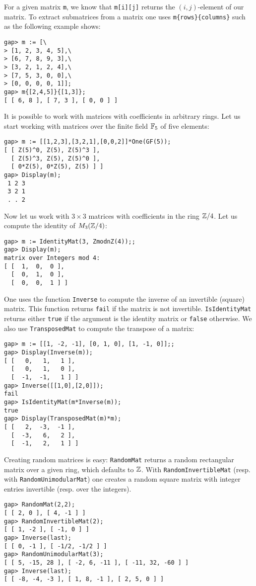 For a given matrix \lstinline{m}, we know that 
\lstinline{m[i][j]} returns the $(i,j)$-element of our matrix. 
To extract submatrices from a matrix one uses 
\lstinline|m{rows}{columns}| such as the following example shows:
\begin{lstlisting}
gap> m := [\
> [1, 2, 3, 4, 5],\
> [6, 7, 8, 9, 3],\
> [3, 2, 1, 2, 4],\
> [7, 5, 3, 0, 0],\
> [0, 0, 0, 0, 1]];
gap> m{[2,4,5]}{[1,3]};
[ [ 6, 8 ], [ 7, 3 ], [ 0, 0 ] ]
\end{lstlisting}

It is possible to work with matrices with coefficients in arbitrary rings. Let
us start working with matrices over the finite field $\mathbb{F}_5$ of five elements:
\begin{lstlisting}
gap> m := [[1,2,3],[3,2,1],[0,0,2]]*One(GF(5));
[ [ Z(5)^0, Z(5), Z(5)^3 ], 
  [ Z(5)^3, Z(5), Z(5)^0 ], 
  [ 0*Z(5), 0*Z(5), Z(5) ] ]
gap> Display(m);
 1 2 3
 3 2 1
 . . 2
\end{lstlisting}
Now let us work with $3\times 3$ matrices with coefficients 
in the ring $\mathbb{Z}/4$. Let us compute the identity of $M_3(\mathbb{Z}/4)$:
\begin{lstlisting}
gap> m := IdentityMat(3, ZmodnZ(4));;
gap> Display(m);
matrix over Integers mod 4:
[ [  1,  0,  0 ],
  [  0,  1,  0 ],
  [  0,  0,  1 ] ]
\end{lstlisting}

One uses the function \lstinline{Inverse} to compute the inverse of an
invertible (square) matrix.  
This function returns \lstinline{fail} if the matrix is not invertible. 
\lstinline{IsIdentityMat} returns either
\lstinline{true} if the argument is the identity matrix or \lstinline{false}
otherwise.  We also use \lstinline{TransposedMat} to compute the transpose of a
matrix:
\begin{lstlisting}
gap> m := [[1, -2, -1], [0, 1, 0], [1, -1, 0]];;
gap> Display(Inverse(m));
[ [   0,   1,   1 ],
  [   0,   1,   0 ],
  [  -1,  -1,   1 ] ]
gap> Inverse([[1,0],[2,0]]);
fail
gap> IsIdentityMat(m*Inverse(m));
true 
gap> Display(TransposedMat(m)*m);
[ [   2,  -3,  -1 ],
  [  -3,   6,   2 ],
  [  -1,   2,   1 ] ]
\end{lstlisting}	

Creating random matrices is easy: \lstinline{RandomMat} returns a random
rectangular matrix over a given ring, which defaults to $\mathbb{Z}$. With
\lstinline{RandomInvertibleMat} (resp. with \lstinline{RandomUnimodularMat})
one creates a random square matrix with integer entries invertible (resp. over
the integers).
\begin{lstlisting}
gap> RandomMat(2,2);
[ [ 2, 0 ], [ 4, -1 ] ]
gap> RandomInvertibleMat(2);
[ [ 1, -2 ], [ -1, 0 ] ]
gap> Inverse(last);
[ [ 0, -1 ], [ -1/2, -1/2 ] ]
gap> RandomUnimodularMat(3);
[ [ 5, -15, 28 ], [ -2, 6, -11 ], [ -11, 32, -60 ] ]
gap> Inverse(last);
[ [ -8, -4, -3 ], [ 1, 8, -1 ], [ 2, 5, 0 ] ]
\end{lstlisting}

